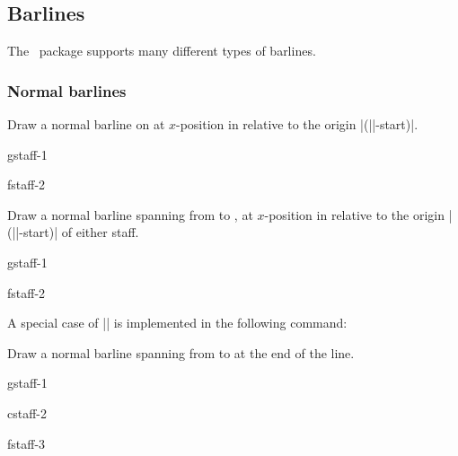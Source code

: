 \subsection{Barlines}\label{sec:multistaff:barlines}
The \tmname\ package supports many different types of barlines. 
\subsubsection{Normal barlines}\label{sec:multistaff:barlines:normal}
\begin{command}{\tmbarline{}}
  Draw a normal barline on  at $x$-position  in 
  relative to the origin |(||-start)|. 
\end{command}
\begin{codeexample}[]
\begin{tmline}%
\begin{tmstaff}{g}{staff-1}\end{tmstaff}%
\begin{tmstaff}{f}{staff-2}\end{tmstaff}%
%
%
\end{tmline}
\end{codeexample}
\begin{command}{\tmbarline*{}}
  Draw a normal barline spanning from  to 
  , at $x$-position  in relative to 
  the origin |(||-start)| of either staff.
\end{command}
\begin{codeexample}[]
\begin{tmline}%
\begin{tmstaff}{g}{staff-1}\end{tmstaff}%
\begin{tmstaff}{f}{staff-2}\end{tmstaff}%
%
\end{tmline}
\end{codeexample}
A special case of |\tmbarline*| is implemented in the following command:
\begin{command}{\tmbarlineendline{}}
  Draw a normal barline spanning from  to 
   at the end of the line.
\end{command}
\begin{codeexample}[]
\begin{tmline}
\begin{tmstaff}{g}{staff-1}\end{tmstaff}%
\begin{tmstaff}{c}{staff-2}\end{tmstaff}%
\begin{tmstaff}{f}{staff-3}\end{tmstaff}%
%
%
\end{tmline}
\end{codeexample}

